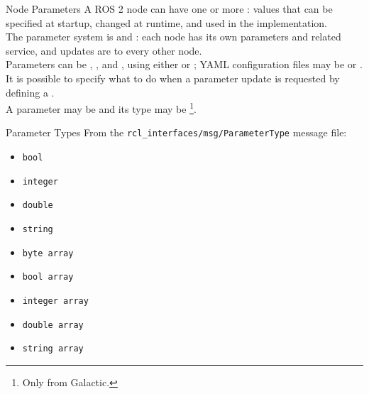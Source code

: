 \begin{frame}{Node Parameters}
A ROS 2 node can have one or more : values that can be specified at startup, changed at runtime, and used in the implementation.\\\vspace{10pt}
The parameter system is  and : each node has its own parameters and related service, and updates are  to every other node.\\\vspace{10pt}
Parameters can be , ,  and , using either  or ; YAML configuration files may be  or .\\\vspace{10pt}
It is possible to specify what to do when a parameter update is requested by defining a .\\\vspace{10pt}
A parameter may be  and its type may be \footnote{Only from Galactic.}.
\end{frame}

\begin{frame}{Parameter Types}
From the \texttt{rcl\_interfaces/msg/ParameterType} message file:
\begin{itemize}
  \item \texttt{bool}
  \item \texttt{integer}
  \item \texttt{double}
  \item \texttt{string}
  \item \texttt{byte array}
  \item \texttt{bool array}
  \item \texttt{integer array}
  \item \texttt{double array}
  \item \texttt{string array}
\end{itemize}
\end{frame}

